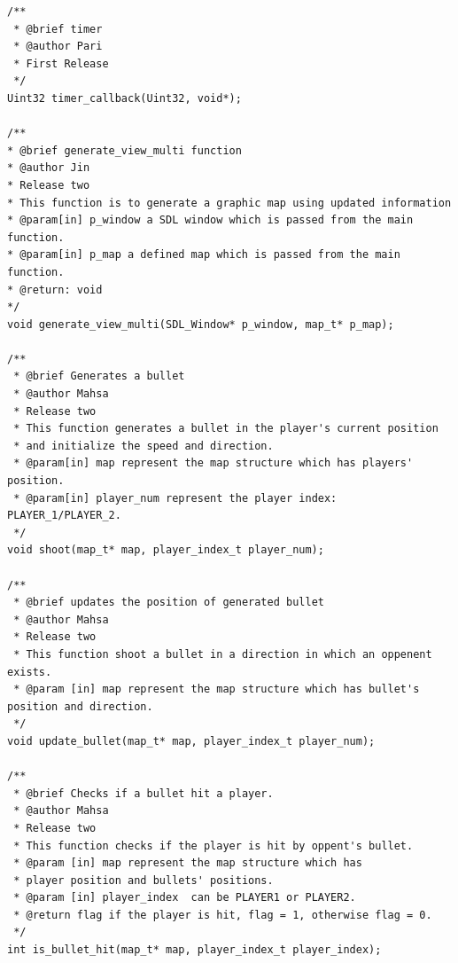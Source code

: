 \begin{verbatim}
/**
 * @brief timer
 * @author Pari
 * First Release
 */
Uint32 timer_callback(Uint32, void*);

/**
* @brief generate_view_multi function
* @author Jin
* Release two
* This function is to generate a graphic map using updated information
* @param[in] p_window a SDL window which is passed from the main function.
* @param[in] p_map a defined map which is passed from the main function.
* @return: void
*/
void generate_view_multi(SDL_Window* p_window, map_t* p_map);

/**
 * @brief Generates a bullet
 * @author Mahsa
 * Release two
 * This function generates a bullet in the player's current position
 * and initialize the speed and direction.
 * @param[in] map represent the map structure which has players' position.
 * @param[in] player_num represent the player index: PLAYER_1/PLAYER_2.
 */
void shoot(map_t* map, player_index_t player_num);

/**
 * @brief updates the position of generated bullet
 * @author Mahsa 
 * Release two
 * This function shoot a bullet in a direction in which an oppenent exists.
 * @param [in] map represent the map structure which has bullet's position and direction.
 */
void update_bullet(map_t* map, player_index_t player_num);

/**
 * @brief Checks if a bullet hit a player.
 * @author Mahsa 
 * Release two
 * This function checks if the player is hit by oppent's bullet.
 * @param [in] map represent the map structure which has 
 * player position and bullets' positions.
 * @param [in] player_index  can be PLAYER1 or PLAYER2.
 * @return flag if the player is hit, flag = 1, otherwise flag = 0.
 */
int is_bullet_hit(map_t* map, player_index_t player_index);
\end{verbatim}